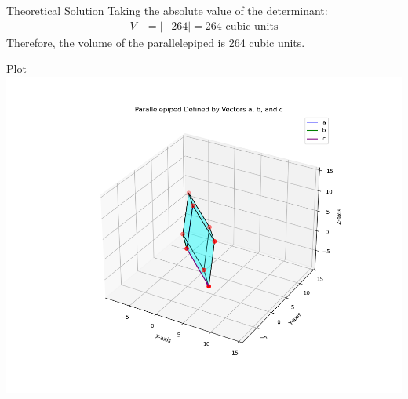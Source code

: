 \documentclass{beamer}
\begin{document}
\begin{frame}{Theoretical Solution}
Taking the absolute value of the determinant:
\begin{align*}
V &= |{-264}| = 264 \text{ cubic units}
\end{align*}
Therefore, the volume of the parallelepiped is 264 cubic units.
\end{frame}

\begin{frame}{Plot}
\centering
\includegraphics[width=0.8\linewidth]{figs/fig1.png}
\end{frame}
\end{document}
